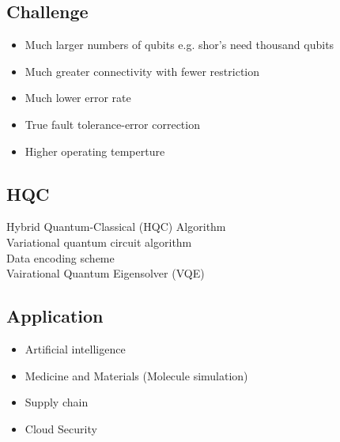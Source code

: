 \documentclass[]{article}
\theoremstyle{nonumberplain}
\begin{document}
\subsection{Challenge}
\begin{itemize}
	\item Much larger numbers of qubits e.g. shor's need thousand qubits
	\item	Much greater connectivity with fewer restriction
	\item Much lower error rate
	\item True fault tolerance-error correction
	\item Higher operating temperture
\end{itemize}
\subsection{HQC}
Hybrid Quantum-Classical (HQC) Algorithm\\
Variational quantum circuit algorithm\\
Data encoding scheme\\
Vairational Quantum Eigensolver (VQE)
\subsection{Application}
\begin{itemize}
	\item Artificial intelligence
	\item Medicine and Materials (Molecule simulation)
	\item Supply chain
	\item Cloud Security
\end{itemize}
\end{document}
